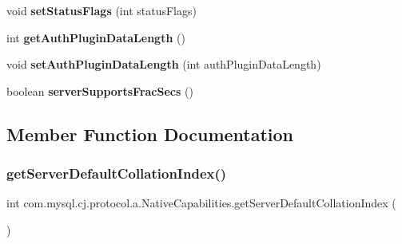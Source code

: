 \begin{DoxyCompactItemize}
void {\bfseries set\+Status\+Flags} (int status\+Flags)
\item 
\mbox{\label{classcom_1_1mysql_1_1cj_1_1protocol_1_1a_1_1_native_capabilities_a81da236be8151fdf8c68863c723dd087}} 
int {\bfseries get\+Auth\+Plugin\+Data\+Length} ()
\item 
\mbox{\label{classcom_1_1mysql_1_1cj_1_1protocol_1_1a_1_1_native_capabilities_a32e01b6486a2d0b24c39e89b81ac21bd}} 
void {\bfseries set\+Auth\+Plugin\+Data\+Length} (int auth\+Plugin\+Data\+Length)
\item 
\mbox{\label{classcom_1_1mysql_1_1cj_1_1protocol_1_1a_1_1_native_capabilities_af0128d4d52981bef0bab74ac88a57cb7}} 
boolean {\bfseries server\+Supports\+Frac\+Secs} ()
\end{DoxyCompactItemize}


\subsection{Member Function Documentation}
\mbox{\label{classcom_1_1mysql_1_1cj_1_1protocol_1_1a_1_1_native_capabilities_adbb90b53368c7f639f652e71ea651993}} 
\subsubsection{\texorpdfstring{get\+Server\+Default\+Collation\+Index()}{getServerDefaultCollationIndex()}}
{\footnotesize\ttfamily int com.\+mysql.\+cj.\+protocol.\+a.\+Native\+Capabilities.\+get\+Server\+Default\+Collation\+Index (\begin{DoxyParamCaption}{ }\end{DoxyParamCaption})}

